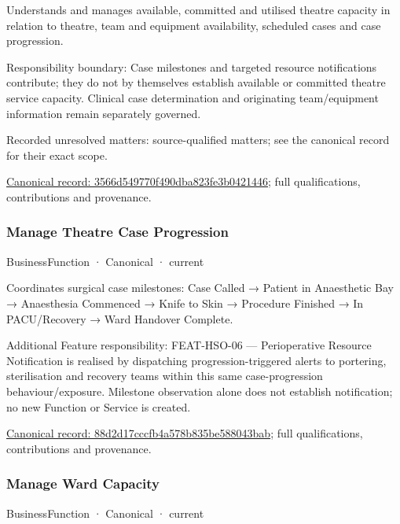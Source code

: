 Understands and manages available, committed and utilised theatre capacity in relation to theatre, team and equipment availability, scheduled cases and case progression.



Responsibility boundary: Case milestones and targeted resource notifications contribute; they do not by themselves establish available or committed theatre service capacity. Clinical case determination and originating team/equipment information remain separately governed.


{\small Recorded unresolved matters: source-qualified matters; see the canonical record for their exact scope.}\par
{\footnotesize \href{../../../../continuum/business/business-function/3566d549770f490dba823fe3b0421446.md}{Canonical record: 3566d549770f490dba823fe3b0421446}; full qualifications, contributions and provenance.}\par
\subsubsection{Manage Theatre Case Progression}

\label{element:88d2d17cccfb4a578b835be588043bab}
{\small BusinessFunction · Canonical · current}\par

Coordinates surgical case milestones: Case Called → Patient in Anaesthetic Bay → Anaesthesia Commenced → Knife to Skin → Procedure Finished → In PACU/Recovery → Ward Handover Complete.



Additional Feature responsibility: FEAT-HSO-06 — Perioperative Resource Notification is realised by dispatching progression-triggered alerts to portering, sterilisation and recovery teams within this same case-progression behaviour/exposure. Milestone observation alone does not establish notification; no new Function or Service is created.


{\footnotesize \href{../../../../continuum/business/business-function/88d2d17cccfb4a578b835be588043bab.md}{Canonical record: 88d2d17cccfb4a578b835be588043bab}; full qualifications, contributions and provenance.}\par
\subsubsection{Manage Ward Capacity}

\label{element:eca5f4fbf92743f987a01930dc4ee763}
{\small BusinessFunction · Canonical · current}\par

